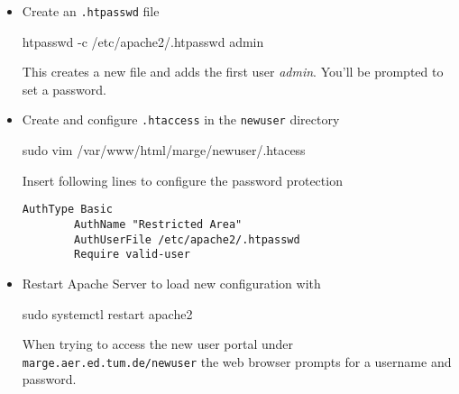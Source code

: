 \begin{itemize}
    \item Create an \texttt{.htpasswd} file
    \begin{terminal}
        htpasswd -c /etc/apache2/.htpasswd admin
    \end{terminal}
    This creates a new file and adds the first user \textit{admin}. You'll be
    prompted to set a password.
    \item Create and configure \texttt{.htaccess} in the \texttt{newuser}
    directory
    \begin{terminal}
        sudo vim /var/www/html/marge/newuser/.htacess
    \end{terminal}
    Insert following lines to configure the password protection
    \begin{lstlisting}[frame={l}]
        AuthType Basic
        AuthName "Restricted Area"
        AuthUserFile /etc/apache2/.htpasswd
        Require valid-user
    \end{lstlisting}
    \item Restart Apache Server to load new configuration with
    \begin{terminal}
        sudo systemctl restart apache2
    \end{terminal} 

    When trying to access the new user portal under
    \texttt{marge.aer.ed.tum.de/newuser} the web browser prompts for a username
    and password.
    
\end{itemize}
